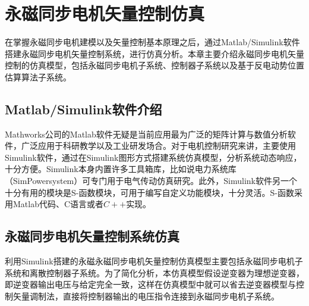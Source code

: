 \chapter{永磁同步电机矢量控制仿真}
在掌握永磁同步电机建模以及矢量控制基本原理之后，通过Matlab/Simulink软件搭建永磁同步电机矢量控制系统，进行仿真分析。本章主要介绍永磁同步电机矢量控制的仿真模型，包括永磁同步电机子系统、控制器子系统以及基于反电动势位置估算算法子系统。
\section{Matlab/Simulink软件介绍}
Mathworks公司的Matlab软件无疑是当前应用最为广泛的矩阵计算与数值分析软件，广泛应用于科研教学以及工业研发场合。对于电机控制研究来讲，主要使用Simulink软件，通过在Simulink图形方式搭建系统仿真模型，分析系统动态响应，十分方便。Simulink本身内置许多工具箱库，比如说电力系统库（SimPowersystem）可专门用于电气传动仿真研究。此外，Simulink软件另一个十分有用的模块是S-函数模块，可用于编写自定义功能模块，十分灵活。S-函数采用Matlab代码、C语言或者$C++$实现。
\section{永磁同步电机矢量控制系统仿真}
利用Simulink搭建的永磁永磁同步电机矢量控制仿真模型主要包括永磁同步电机子系统和离散控制器子系统。为了简化分析，本仿真模型假设逆变器为理想逆变器，即逆变器输出电压与给定完全一致，这样在仿真模型中就可以省去逆变器模型与控制矢量调制法，直接将控制器输出的电压指令连接到永磁同步电机子系统。
